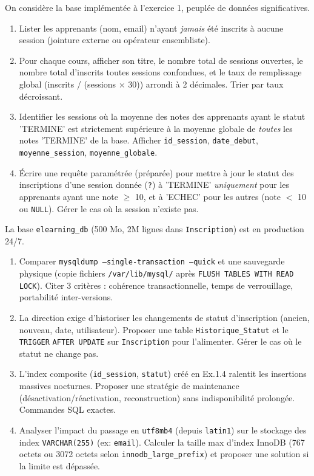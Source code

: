 \documentclass[11pt]{article}
\begin{document}
\begin{exercice}
On considère la base implémentée à l'exercice 1, peuplée de données significatives.
\begin{enumerate}
    \item Lister les apprenants (nom, email) n'ayant \emph{jamais} été inscrits à aucune session (jointure externe ou opérateur ensembliste).
    \item Pour chaque cours, afficher son titre, le nombre total de sessions ouvertes, le nombre total d'inscrits toutes sessions confondues, et le taux de remplissage global (inscrits / (sessions $\times$ 30)) arrondi à 2 décimales. Trier par taux décroissant.
    \item Identifier les sessions où la moyenne des notes des apprenants ayant le statut 'TERMINE' est strictement supérieure à la moyenne globale de \emph{toutes} les notes 'TERMINE' de la base. Afficher \texttt{id\_session}, \texttt{date\_debut}, \texttt{moyenne\_session}, \texttt{moyenne\_globale}.
    \item Écrire une requête paramétrée (préparée) pour mettre à jour le statut des inscriptions d'une session donnée (\texttt{?}) à 'TERMINE' \emph{uniquement} pour les apprenants ayant une note $\ge$ 10, et à 'ECHEC' pour les autres (note $<$ 10 ou \texttt{NULL}). Gérer le cas où la session n'existe pas.
\end{enumerate}
\end{exercice}

\begin{exercice}
La base \texttt{elearning\_db} (500 Mo, 2M lignes dans \texttt{Inscription}) est en production 24/7.
\begin{enumerate}
    \item Comparer \texttt{mysqldump --single-transaction --quick} et une sauvegarde physique (copie fichiers \texttt{/var/lib/mysql/} après \texttt{FLUSH TABLES WITH READ LOCK}). Citer 3 critères : cohérence transactionnelle, temps de verrouillage, portabilité inter-versions.
    \item La direction exige d'historiser les changements de statut d'inscription (ancien, nouveau, date, utilisateur). Proposer une table \texttt{Historique\_Statut} et le \texttt{TRIGGER} \texttt{AFTER UPDATE} sur \texttt{Inscription} pour l'alimenter. Gérer le cas où le statut ne change pas.
    \item L'index composite (\texttt{id\_session}, \texttt{statut}) créé en Ex.1.4 ralentit les insertions massives nocturnes. Proposer une stratégie de maintenance (désactivation/réactivation, reconstruction) sans indisponibilité prolongée. Commandes SQL exactes.
    \item Analyser l'impact du passage en \texttt{utf8mb4} (depuis \texttt{latin1}) sur le stockage des index \texttt{VARCHAR(255)} (ex: \texttt{email}). Calculer la taille max d'index InnoDB (767 octets ou 3072 octets selon \texttt{innodb\_large\_prefix}) et proposer une solution si la limite est dépassée.
\end{enumerate}
\end{exercice}
\end{document}
